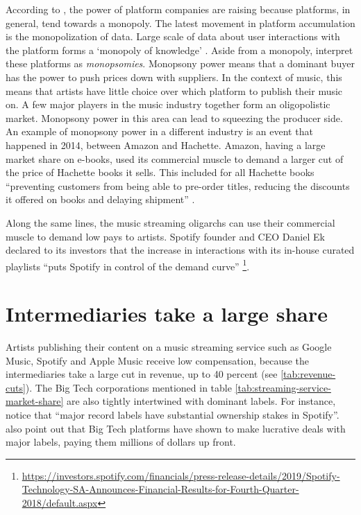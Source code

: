 According to \cite{srnicek2017platform}, the power of platform companies are raising because platforms, in general, tend towards a monopoly. The latest movement in platform accumulation is the monopolization of data. Large scale of data about user interactions with the platform forms a `monopoly of knowledge' \citep{innis2007empire}. Aside from a monopoly, \cite{rayna2009monometapoly} interpret these platforms as \textit{monopsomies}. Monopsony power means that a dominant buyer has the power to push prices down with suppliers. In the context of music, this means that artists have little choice over which platform to publish their music on. A few major players in the music industry together form an oligopolistic market. Monopsony power in this area can lead to squeezing the producer side. An example of monopsony power in a different industry is an event that happened in 2014, between Amazon and Hachette. Amazon, having a large market share on e-books, used its commercial muscle to demand a larger cut of the price of Hachette books it sells. This included for all Hachette books ``preventing customers from being able to pre-order titles, reducing the discounts it offered on books and delaying shipment'' \citep{theguardian2014amazon}. 

Along the same lines, the music streaming oligarchs can use their commercial muscle to demand low pays to artists. Spotify founder and CEO Daniel Ek declared to its investors that the increase in interactions with its in-house curated playlists ``puts Spotify in control of the demand curve'' \footnote{\url{https://investors.spotify.com/financials/press-release-details/2019/Spotify-Technology-SA-Announces-Financial-Results-for-Fourth-Quarter-2018/default.aspx}}.

\section{Intermediaries take a large share}
Artists publishing their content on a music streaming service such as Google Music, Spotify and Apple Music receive low compensation, because the intermediaries take a large cut in revenue, up to 40 percent (see \ref{tab:revenue-cuts}). The Big Tech corporations mentioned in table \ref{tab:streaming-service-market-share} are also tightly intertwined with dominant labels. For instance, \cite{aguiar2018platforms} notice that ``major record labels have substantial ownership stakes in Spotify''. \cite{meier2019rising} also point out that Big Tech platforms have shown to make lucrative deals with major labels, paying them millions of dollars up front.

